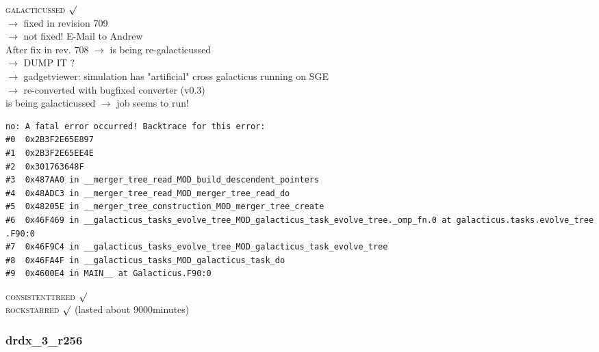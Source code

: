 \textsc{galacticussed} $\surd$ \\
$\rightarrow$ fixed in revision 709 \\
$\rightarrow$  not fixed! E-Mail to Andrew \\
After fix in rev. 708 $\rightarrow$ is being re-galacticussed \\
$\rightarrow$ DUMP IT ? \\
$\rightarrow$ gadgetviewer: simulation has "artificial" cross 
galacticus running on SGE \\
$\rightarrow$ re-converted with bugfixed converter (v0.3) \\
is being galacticussed $\rightarrow$ job seems to run! \\
\begin{verbatim}
no: A fatal error occurred! Backtrace for this error:
#0  0x2B3F2E65E897
#1  0x2B3F2E65EE4E
#2  0x301763648F
#3  0x487AA0 in __merger_tree_read_MOD_build_descendent_pointers
#4  0x48ADC3 in __merger_tree_read_MOD_merger_tree_read_do
#5  0x48205E in __merger_tree_construction_MOD_merger_tree_create
#6  0x46F469 in __galacticus_tasks_evolve_tree_MOD_galacticus_task_evolve_tree._omp_fn.0 at galacticus.tasks.evolve_tree
.F90:0
#7  0x46F9C4 in __galacticus_tasks_evolve_tree_MOD_galacticus_task_evolve_tree
#8  0x46FA4F in __galacticus_tasks_MOD_galacticus_task_do
#9  0x4600E4 in MAIN__ at Galacticus.F90:0
\end{verbatim}
\textsc{consistenttreed} $\surd$ \\ 
\textsc{rockstarred} $\surd$ (lasted about 9000minutes) \\

% 
%
%
%
%
%
%
%


\newpage
\subsubsection{drdx\_3\_r256}

